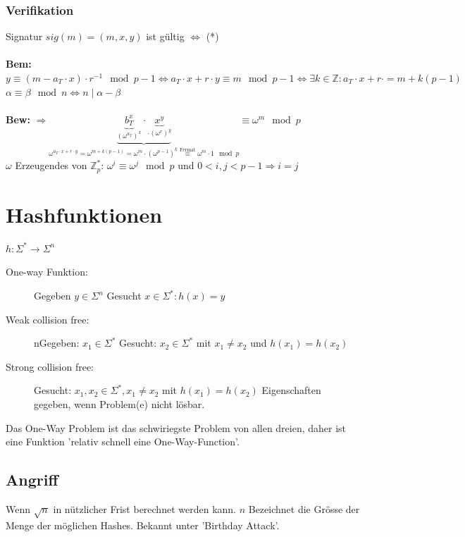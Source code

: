 \documentclass[landscape,twocolumn,a4paper]{article}
\newcommand{\ZN}{\mathbb{Z}} %
\newcommand{\Bold}[1]{\textbf{#1}} %
\newcommand{\T}[1]{\text{#1}} %
\newcommand{\Lra}{\Leftrightarrow}
\newcommand{\Ra}{\Rightarrow}
\newcommand{\Oben}[2]{\overset{#1}{#2}} %
\begin{document}
\subsubsection{Verifikation}
Signatur $sig(m)=(m,x,y)$ ist gültig $\Lra$ (*)\\
\\
\Bold{Bem:} $y\equiv(m-a_T\cdot x)\cdot r^{-1}\mod p-1\Lra a_T\cdot x+r\cdot y\equiv m\mod p-1\Lra\exists k\in\ZN:a_T\cdot x+r\cdot=m+k(p-1)$\\
$\alpha\equiv\beta\mod n\Lra n\mid\alpha-\beta$\\
\\
\Bold{Bew:} $\Ra\underbrace{\underbrace{b_T^x}_{(\omega^{a_T})^x}\cdot\underbrace{x^y}_{\cdot(\omega^r)^y}}_{\omega^{a_T\cdot x+r\cdot y}=\omega^{m+k(p-1)}=\omega^m\cdot(\omega^{p-1})^k\Oben{\T{Fermat}}{\equiv}\omega^m\cdot1\mod p}\equiv\omega^m\mod p$\\
$\omega$ Erzeugendes von $\ZN_p^*$: $\omega^i\equiv\omega^j\mod p$ und $0<i,j<p-1\Ra i=j$

\section{Hashfunktionen}
$h: \Sigma^* \rightarrow \Sigma^n$
\begin{description}
	\item[One-way Funktion:] Gegeben $y \in \Sigma^n$ Gesucht $x \in \Sigma^*: h(x) = y$
	\item[Weak collision free:]nGegeben: $x_1 \in \Sigma^*$ Gesucht: $x_2 \in \Sigma^*$ mit $x_1 \neq x_2$ und $h(x_1) = h(x_2)$
	\item[Strong collision free:] Gesucht: $x_1, x_2 \in \Sigma^*, x_1 \neq x_2$ mit $h(x_1) = h(x_2)$ Eigenschaften gegeben, wenn Problem(e) nicht lösbar.
\end{description}
Das One-Way Problem ist das schwiriegste Problem von allen dreien, daher ist eine Funktion 'relativ schnell eine One-Way-Function'.

\subsection{Angriff}
Wenn $\sqrt{n}$ in nützlicher Frist berechnet werden kann. $n$ Bezeichnet die Grösse der Menge der möglichen Hashes. Bekannt unter 'Birthday Attack'.
\end{document}
